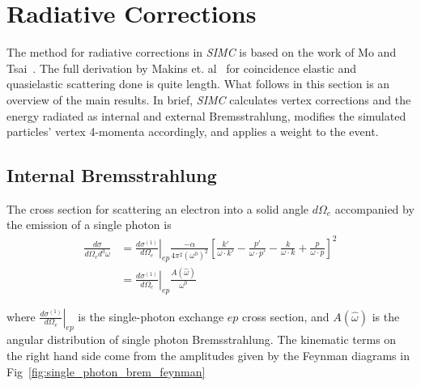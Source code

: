 \section{Radiative Corrections}
The method for radiative corrections in \textit{SIMC} is based on the work of
Mo and Tsai~\cite{Mo_1969}.
The full derivation by Makins et. al~\cite{Ent_2001, Makins_1994} for
coincidence elastic and quasielastic scattering done is quite length.
What follows in this section is an overview of the main results.
In brief, \textit{SIMC} calculates vertex corrections and the energy radiated
as internal and external Bremsstrahlung, modifies the simulated particles'
vertex 4-momenta accordingly, and applies a weight to the event.

\subsection{Internal Bremsstrahlung}
The cross section for scattering an electron into a solid angle $d\Omega_e$
accompanied by the emission of a single photon is
\begin{align}
    \frac{d\sigma}{d\Omega_e d^3\omega} &=
        \left.\frac{d \sigma^{(1)}}{d \Omega_{e}}\right|_{e p}
        \frac{-\alpha}{4 \pi^{2} (\omega^{0})^2}
        \left[ \frac{k'}{\omega \cdot k'} -
                \frac{p'}{\omega \cdot p'} -
               \frac{k}{\omega \cdot k} +
               \frac{p}{\omega \cdot p}
        \right]^2 \\
     &= \left. \frac{d\sigma^{(1)}}{d\Omega_e}\right|_{ep}
         \frac{A(\hat{\omega})}{\omega^0}
\end{align}

where $\left. \frac{d\sigma^{(1)}}{d\Omega_e}\right|_{ep}$ is the single-photon
exchange $ep$ cross section,
and $A(\hat{\omega})$ is the angular distribution of single photon Bremsstrahlung.
The kinematic terms on the right hand side come from the
amplitudes given by the Feynman diagrams in Fig~\ref{fig:single_photon_brem_feynman}

